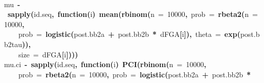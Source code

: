 \documentclass{article}
\makeatletter
\newcommand{\hlnumber}[1]{\textcolor[rgb]{0,0,0}{#1}}%
\newcommand{\hlfunctioncall}[1]{\textcolor[rgb]{.5,0,.33}{\textbf{#1}}}%
\newcommand{\hlkeyword}[1]{\textbf{#1}}%
\newcommand{\hlargument}[1]{\textcolor[rgb]{.69,.25,.02}{#1}}%
\newcommand{\hlformalargs}[1]{\hlargument{#1}}%
\newcommand{\hlassignement}[1]{\textbf{#1}}%
\newcommand{\hlsymbol}[1]{#1}%
\newcommand{\hlstd}[1]{\textcolor[rgb]{0,0,0}{#1}}%
\newenvironment{kframe}{%
 \def\FrameCommand##1{\hskip\@totalleftmargin \hskip-\fboxsep
 \colorbox{shadecolor}{##1}\hskip-\fboxsep
     \hskip-\linewidth \hskip-\@totalleftmargin \hskip\columnwidth}%
 \MakeFramed {\advance\hsize-\width
   \@totalleftmargin\z@ \linewidth\hsize
   \@setminipage}}%
 {\par\unskip\endMakeFramed}
\newenvironment{knitrout}{}{} %
\makeatother
\begin{document}
\begin{knitrout}
{\begin{kframe}
\begin{flushleft}
\ttfamily\noindent
\hspace*{\fill}\\
\hlstd{}\hlsymbol{mu}{\ }\hlassignement{\usebox{\hlnormalsizeboxlessthan}-}{\ }\hlfunctioncall{sapply}\hlkeyword{(}\hlsymbol{id.seq}\hlkeyword{,}{\ }\hlkeyword{function}\hlkeyword{(}\hlformalargs{i}\hlkeyword{)}{\ }\hlfunctioncall{mean}\hlkeyword{(}\hlfunctioncall{rbinom}\hlkeyword{(}\hlargument{n}{\ }\hlargument{=}{\ }\hlnumber{10000}\hlkeyword{,}{\ }\hlargument{prob}{\ }\hlargument{=}{\ }\hlfunctioncall{rbeta2}\hlkeyword{(}\hlargument{n}{\ }\hlargument{=}{\ }\hlnumber{10000}\hlkeyword{,}\hspace*{\fill}\\
\hlstd{}{\ }{\ }{\ }{\ }\hlargument{prob}{\ }\hlargument{=}{\ }\hlfunctioncall{logistic}\hlkeyword{(}\hlsymbol{post.bb2}\hlkeyword{\usebox{\hlnormalsizeboxdollar}}\hlsymbol{a}{\ }\hlkeyword{+}{\ }\hlsymbol{post.bb2}\hlkeyword{\usebox{\hlnormalsizeboxdollar}}\hlsymbol{b}{\ }\hlkeyword{*}{\ }\hlsymbol{d}\hlkeyword{\usebox{\hlnormalsizeboxdollar}}\hlsymbol{FGA}\hlkeyword{[}\hlsymbol{i}\hlkeyword{]}\hlkeyword{)}\hlkeyword{,}{\ }\hlargument{theta}{\ }\hlargument{=}{\ }\hlfunctioncall{exp}\hlkeyword{(}\hlsymbol{post.bb2}\hlkeyword{\usebox{\hlnormalsizeboxdollar}}\hlsymbol{tau}\hlkeyword{)}\hlkeyword{)}\hlkeyword{,}\hspace*{\fill}\\
\hlstd{}{\ }{\ }{\ }{\ }\hlargument{size}{\ }\hlargument{=}{\ }\hlsymbol{d}\hlkeyword{\usebox{\hlnormalsizeboxdollar}}\hlsymbol{FGA}\hlkeyword{[}\hlsymbol{i}\hlkeyword{]}\hlkeyword{)}\hlkeyword{)}\hlkeyword{)}\hspace*{\fill}\\
\hlstd{}\hlsymbol{mu.ci}{\ }\hlassignement{\usebox{\hlnormalsizeboxlessthan}-}{\ }\hlfunctioncall{sapply}\hlkeyword{(}\hlsymbol{id.seq}\hlkeyword{,}{\ }\hlkeyword{function}\hlkeyword{(}\hlformalargs{i}\hlkeyword{)}{\ }\hlfunctioncall{PCI}\hlkeyword{(}\hlfunctioncall{rbinom}\hlkeyword{(}\hlargument{n}{\ }\hlargument{=}{\ }\hlnumber{10000}\hlkeyword{,}\hspace*{\fill}\\
\hlstd{}{\ }{\ }{\ }{\ }\hlargument{prob}{\ }\hlargument{=}{\ }\hlfunctioncall{rbeta2}\hlkeyword{(}\hlargument{n}{\ }\hlargument{=}{\ }\hlnumber{10000}\hlkeyword{,}{\ }\hlargument{prob}{\ }\hlargument{=}{\ }\hlfunctioncall{logistic}\hlkeyword{(}\hlsymbol{post.bb2}\hlkeyword{\usebox{\hlnormalsizeboxdollar}}\hlsymbol{a}{\ }\hlkeyword{+}{\ }\hlsymbol{post.bb2}\hlkeyword{\usebox{\hlnormalsizeboxdollar}}\hlsymbol{b}{\ }\hlkeyword{*}\hspace*{\fill}\\

\end{flushleft}
\end{kframe}}
\end{knitrout}
\end{document}
